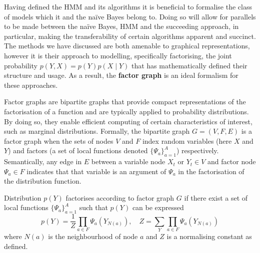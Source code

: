 \documentclass[../main.tex]{subfiles}
\begin{document}
Having defined the HMM and its algorithms it is beneficial to formalise the class of models which it and the na{\"i}ve Bayes belong to.
Doing so will allow for parallels to be made between the na{\"i}ve Bayes, HMM and the succeeding approach, in particular, making the transferability of certain algorithms apparent and succinct.
The methods we have discussed are both amenable to graphical representations, however it is their approach to modelling, specifically factorising, the joint probability $p(Y,X) = p(Y)p(X \mid Y)$ that has mathematically defined their structure and usage.
As a result, the \textbf{factor graph} is an ideal formalism for these approaches.

Factor graphs are bipartite graphs that provide compact representations of the factorisation of a function and are typically applied to probability distributions.
By doing so, they enable efficient computing of certain characteristics of interest, such as marginal distributions.
Formally, the bipartite graph $G = (V,F,E)$ is a factor graph when the sets of nodes $V$ and $F$ index random variables (here $X$ and $Y$) and factors (a set of local functions denoted $\{\Psi_a \}_{a=1}^A$) respectively.
Semantically, any edge in $E$ between a variable node $X_t \text{ or } Y_t \in V$ and factor node $\Psi_a \in F$ indicates that that variable is an argument of $\Psi_a$ in the factorisation of the distribution function.
\begin{definition}%
    Distribution $p(Y)$ factorises according to factor graph $G$ if there exist a set of local functions $\{ \Psi_a \}_{a=1}^A$ such that $p(Y)$ can be expressed
    \begin{equation*}
        p(Y) = \frac{1}{Z} \prod_{a \in F} \Psi_a (Y_{N(a)}), \quad Z = \sum_Y \prod_{a \in F} \Psi_a (Y_{N(a)})
    \end{equation*}
    where $N(a)$ is the neighbourhood of node $a$ and $Z$ is a normalising constant as defined.
\end{definition}
\end{document}
